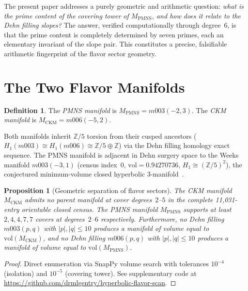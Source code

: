 \documentclass[12pt]{article}
\newtheorem{proposition}[theorem]{Proposition}
\theoremstyle{definition}
\newtheorem{definition}[theorem]{Definition}
\begin{document}
The present paper addresses a purely geometric and arithmetic question:
\emph{what is the prime content of the covering tower of
$M_{\mathrm{PMNS}}$, and how does it relate to the Dehn filling slopes?}
The answer, verified computationally through degree~6, is that the prime
content is completely determined by seven primes, each an elementary
invariant of the slope pair. This constitutes a precise, falsifiable
arithmetic fingerprint of the flavor sector geometry.

\section{The Two Flavor Manifolds}

\begin{definition}
The \emph{PMNS manifold} is $M_{\mathrm{PMNS}} = m003(-2,3)$.
The \emph{CKM manifold} is $M_{\mathrm{CKM}} = m006(-5,2)$.
\end{definition}

Both manifolds inherit $\mathbb{Z}/5$ torsion from their cusped ancestors
($H_1(m003) \cong H_1(m006) \cong \mathbb{Z}/5 \oplus \mathbb{Z}$) via
the Dehn filling homology exact sequence. The PMNS manifold is adjacent
in Dehn surgery space to the Weeks manifold $m003(-3,1)$
(census index~0, $\mathrm{vol} = 0.94270736$,
$H_1 \cong (\mathbb{Z}/5)^2$), the conjectured minimum-volume closed
hyperbolic 3-manifold~\cite{Weeks}.

\begin{proposition}[Geometric separation of flavor sectors]
\label{prop:separation}
The CKM manifold $M_{\mathrm{CKM}}$ admits no parent manifold at cover
degrees~$2$--$5$ in the complete 11{,}031-entry orientable closed census.
The PMNS manifold $M_{\mathrm{PMNS}}$ supports at least $2, 4, 4, 7, 7$
covers at degrees~$2$--$6$ respectively.
Furthermore, no Dehn filling $m003(p,q)$ with $|p|,|q|\leq 10$ produces
a manifold of volume equal to $\mathrm{vol}(M_{\mathrm{CKM}})$, and no
Dehn filling $m006(p,q)$ with $|p|,|q|\leq 10$ produces a manifold of
volume equal to $\mathrm{vol}(M_{\mathrm{PMNS}})$.
\end{proposition}

\begin{proof}
Direct enumeration via SnapPy volume search with tolerances $10^{-4}$
(isolation) and $10^{-5}$ (covering tower). See supplementary code at
\url{https://github.com/drmlgentry/hyperbolic-flavor-scan}.
\end{proof}
\end{document}

